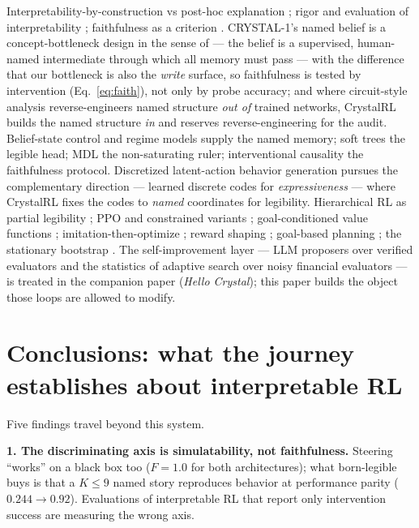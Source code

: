 \documentclass[11pt]{article}
\begin{document}
Interpretability-by-construction vs post-hoc explanation \citep{rudin2019,lipton2018}; rigor
and evaluation of interpretability \citep{doshivelez2017,hoffman2018}; faithfulness as a
criterion \citep{jacovi2020}. CRYSTAL-1's named belief is a concept-bottleneck design in the
sense of \citet{koh2020} --- the belief is a supervised, human-named intermediate through which
all memory must pass --- with the difference that our bottleneck is also the \emph{write}
surface, so faithfulness is tested by intervention (Eq.~\ref{eq:faith}), not only by probe
accuracy; and where circuit-style analysis \citep{olah2020} reverse-engineers named structure
\emph{out of} trained networks, CrystalRL builds the named structure \emph{in} and reserves
reverse-engineering for the audit. Belief-state control \citep{kaelbling1998} and regime models
\citep{hamilton1989} supply the named memory; soft trees \citep{frosst2017} the legible head;
MDL \citep{rissanen1978} the non-saturating ruler; interventional causality \citep{pearl2009}
the faithfulness protocol. Discretized latent-action behavior generation \citep{lee2024vqbet}
pursues the complementary direction --- learned discrete codes for \emph{expressiveness} ---
where CrystalRL fixes the codes to \emph{named} coordinates for legibility. Hierarchical RL as
partial legibility \citep{sutton1999options,bacon2017option}; PPO and constrained variants
\citep{schulman2017ppo,achiam2017}; goal-conditioned value functions \citep{schaul2015};
imitation-then-optimize \citep{ross2011dagger,rusu2016distillation}; reward shaping
\citep{ng1999shaping}; goal-based planning \citep{das2020goals,browne1999}; the stationary
bootstrap \citep{politis1994}. The self-improvement layer --- LLM proposers over verified
evaluators \citep{romera2024funsearch,novikov2025alphaevolve,ma2023eureka,wang2023voyager} and
the statistics of adaptive search over noisy financial evaluators \citep{baileylopez2014dsr}
--- is treated in the companion paper (\emph{Hello Crystal}); this paper builds the object
those loops are allowed to modify.

\section{Conclusions: what the journey establishes about interpretable RL}
\label{sec:conclusions}

Five findings travel beyond this system.

\textbf{1. The discriminating axis is simulatability, not faithfulness.} Steering ``works'' on
a black box too ($F{=}1.0$ for both architectures); what born-legible buys is that a $K{\le}9$
named story reproduces behavior at performance parity ($0.244 \to 0.92$). Evaluations of
interpretable RL that report only intervention success are measuring the wrong axis.
\end{document}
